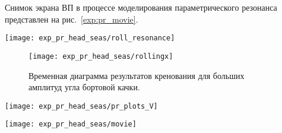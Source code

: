 Снимок экрана ВП в процессе моделирования параметрического резонанса представлен на рис.~\ref{exp:pr_movie}.

\begin{sidewaysfigure}
	\begin{center}
	\texttt{[image: exp\_pr\_head\_seas/roll\_resonance]}
	\end{center}
	\caption{График 10~\%-ной обеспеченность модуля угла бортовой качки в зависимости от скорости судна.}
	\label{pr2_res}
\end{sidewaysfigure}



\begin{figure}[h!]
	\begin{center}
	\texttt{[image: exp\_pr\_head\_seas/rollingx]}
	\end{center}
	\caption{Временная диаграмма результатов кренования для больших амплитуд угла бортовой качки.}
	\label{rollingx}
\end{figure}


\begin{sidewaysfigure}
	\begin{center}
	\texttt{[image: exp\_pr\_head\_seas/pr\_plots\_V]}
	\end{center}
	\caption{Временные диаграммы качки для диапазона скоростей $6.5..9\ \text{м/с}$.}
	\label{exp_pr_rolling_resonance_head}
\end{sidewaysfigure}

\begin{sidewaysfigure}
	\begin{center}
	\texttt{[image: exp\_pr\_head\_seas/movie]}
	\end{center}
	\caption{Опасный крен вызванный параметрическим резонансом на встречной волне}
	\label{exp:pr_movie}
\end{sidewaysfigure}


